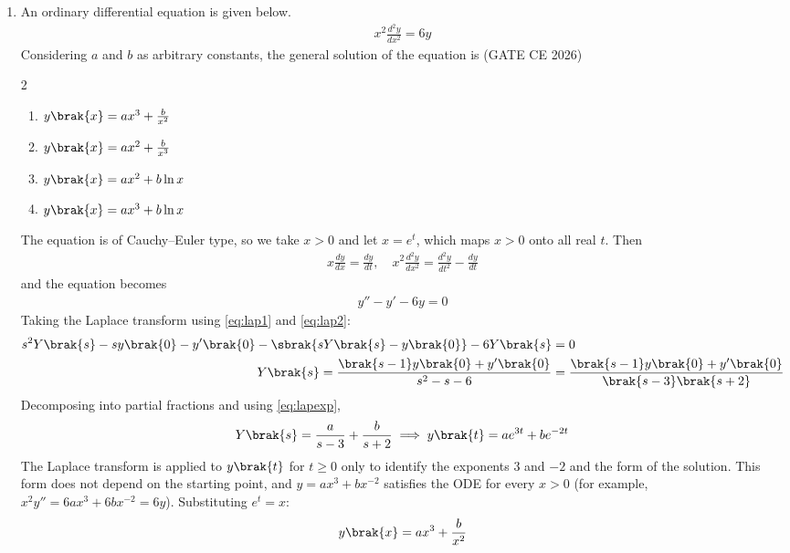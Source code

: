 \begin{enumerate}[label=\thesubsection.\arabic*, ref=\thesubsection.\theenumi, itemsep=0pt, leftmargin=*]
\item An ordinary differential equation is given below.
\begin{align}
x^2\frac{d^2y}{dx^2} = 6y
\end{align}
Considering $a$ and $b$ as arbitrary constants, the general solution of the equation is \hfill (GATE CE 2026)
\begin{multicols}{2}
\begin{enumerate}[label=\alph*), itemsep=0pt]
\item $y\brak{x} = ax^3 + \frac{b}{x^2}$
\item $y\brak{x} = ax^2 + \frac{b}{x^3}$
\item $y\brak{x} = ax^2 + b\ln x$
\item $y\brak{x} = ax^3 + b\ln x$
\end{enumerate}
\end{multicols}
\solution The equation is of Cauchy--Euler type, so we take $x > 0$ and let $x = e^t$, which maps $x > 0$ onto all real $t$. Then
\begin{align}
x\frac{dy}{dx} = \frac{dy}{dt},\quad x^2\frac{d^2y}{dx^2} = \frac{d^2y}{dt^2} - \frac{dy}{dt}
\end{align}
and the equation becomes
\begin{align}
y'' - y' - 6y = 0
\label{eq:q37t}
\end{align}
Taking the Laplace transform using \eqref{eq:lap1} and \eqref{eq:lap2}:
\begin{align}
s^2Y\brak{s} - sy\brak{0} - y'\brak{0} - \sbrak{sY\brak{s} - y\brak{0}} - 6Y\brak{s} &= 0\\
Y\brak{s} = \frac{\brak{s-1}y\brak{0} + y'\brak{0}}{s^2 - s - 6} &= \frac{\brak{s-1}y\brak{0} + y'\brak{0}}{\brak{s-3}\brak{s+2}}
\end{align}
Decomposing into partial fractions and using \eqref{eq:lapexp},
\begin{align}
Y\brak{s} = \frac{a}{s-3} + \frac{b}{s+2} \implies y\brak{t} = ae^{3t} + be^{-2t}
\end{align}
The Laplace transform is applied to $y\brak{t}$ for $t \ge 0$ only to identify the exponents $3$ and $-2$ and the form of the solution. This form does not depend on the starting point, and $y = ax^3 + bx^{-2}$ satisfies the ODE for every $x > 0$ (for example, $x^2y'' = 6ax^3 + 6bx^{-2} = 6y$). Substituting $e^t = x$:
\begin{align}
y\brak{x} = ax^3 + \frac{b}{x^2}
\end{align}


\end{enumerate}
